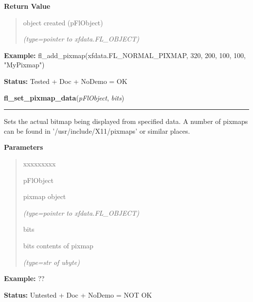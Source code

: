 \begin{boxedminipage}{\funcwidth}
\begin{quote}
      \end{quote}

      \textbf{Return Value}
    \vspace{-1ex}

      \begin{quote}
      object created (pFlObject)

      {\it (type=pointer to xfdata.FL\_OBJECT)}

      \end{quote}

\textbf{Example:} fl\_add\_pixmap(xfdata.FL\_NORMAL\_PIXMAP, 320, 200, 100, 100,         
"MyPixmap")



\textbf{Status:} Tested + Doc + NoDemo = OK



    \end{boxedminipage}

    \label{xformslib:flbitmap:fl_set_pixmap_data}

    \vspace{0.5ex}

\hspace{.8\funcindent}\begin{boxedminipage}{\funcwidth}

    \raggedright \textbf{fl\_set\_pixmap\_data}(\textit{pFlObject}, \textit{bits})

    \vspace{-1.5ex}

    \rule{\textwidth}{0.5\fboxrule}
\setlength{\parskip}{2ex}
    Sets the actual bitmap being displayed from specified data. A number of
    pixmaps can be found in '/usr/include/X11/pixmaps' or similar places.

\setlength{\parskip}{1ex}
      \textbf{Parameters}
      \vspace{-1ex}

      \begin{quote}
        \begin{Ventry}{xxxxxxxxx}

          \item[pFlObject]

          pixmap object

            {\it (type=pointer to xfdata.FL\_OBJECT)}

          \item[bits]

          bits contents of pixmap

            {\it (type=str of ubyte)}

        \end{Ventry}

      \end{quote}

\textbf{Example:} ??



\textbf{Status:} Untested + Doc + NoDemo = NOT OK



    \end{boxedminipage}

